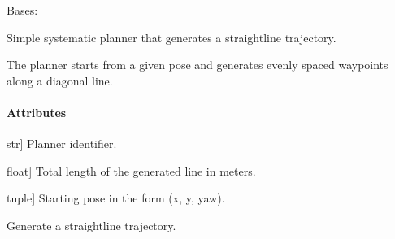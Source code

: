 \documentclass[letterpaper,10pt,english]{sphinxmanual}
\begin{document}

\begin{fulllineitems}
\label{\detokenize{mirte_lc_nav2.navigators:mirte_lc_nav2.navigators.StraightLinePath}}
\pysigstartsignatures
\pysiglinewithargsret
{}
{\sphinxparamcomma {}\sphinxparamcomma {}}
{}
\pysigstopsignatures
\sphinxAtStartPar
Bases: {\hyperref[\detokenize{mirte_lc_nav2.navigator_types:mirte_lc_nav2.navigator_types.SystematicNavigator}]{}}

\sphinxAtStartPar
Simple systematic planner that generates a straight\sphinxhyphen{}line trajectory.

\sphinxAtStartPar
The planner starts from a given pose and generates evenly spaced
waypoints along a diagonal line.


\paragraph{Attributes}
\label{\detokenize{mirte_lc_nav2.navigators:id28}}\begin{description}
\sphinxlineitem{name}{[}str{]}
\sphinxAtStartPar
Planner identifier.

\sphinxlineitem{length}{[}float{]}
\sphinxAtStartPar
Total length of the generated line in meters.

\sphinxlineitem{start\_pose}{[}tuple{]}
\sphinxAtStartPar
Starting pose in the form (x, y, yaw).

\end{description}

\begin{fulllineitems}
\label{\detokenize{mirte_lc_nav2.navigators:mirte_lc_nav2.navigators.StraightLinePath.generate_path}}
\pysigstartsignatures
\pysiglinewithargsret
{}
{}
{}
\pysigstopsignatures
\sphinxAtStartPar
Generate a straight\sphinxhyphen{}line trajectory.


\end{fulllineitems}
\end{fulllineitems}
\end{document}
